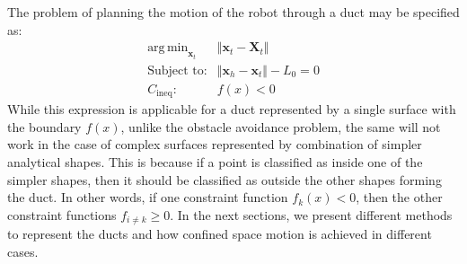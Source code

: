 \documentclass[12pt,a4]{article}
\DeclareMathOperator*{\argmin}{arg\,min}
\begin{document}
The problem of planning the motion of the robot through a duct may be specified as:
\begin{align} \label{eq:path_planning_opt}
\argmin_{\textbf{x}_t} &\Vert \textbf{x}_t-\textbf{X}_t \Vert\\
\text{Subject to:} &\Vert \textbf{x}_h - \textbf{x}_t \Vert -L_0 = 0 \nonumber \\
C_{\text{ineq}}:~~&{f}(x) < 0 \nonumber
\end{align}
While this expression is applicable for a duct represented by a single surface with the boundary $f(x)$, unlike the obstacle avoidance problem, the same will not work in the case of complex surfaces represented by combination of simpler analytical shapes. This is because if a point is classified as inside one of the simpler shapes, then it should be classified as outside the other shapes forming the duct. In other words, if one constraint function $f_k(x)< 0$, then the other constraint functions $f_{i\neq k}\geq 0$. In the next sections, we present different methods to represent the ducts and how confined space motion is achieved in different cases. 
\end{document}
